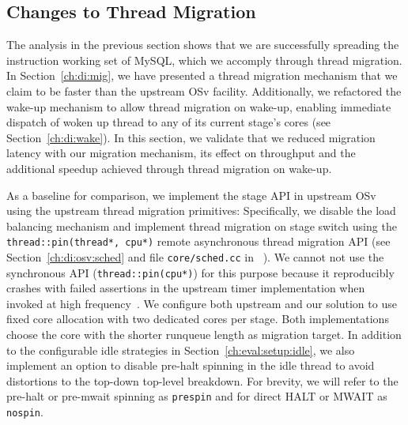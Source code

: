 \documentclass[12pt,a4paper]{book}
\begin{document}
\clearpage
\subsection{Changes to Thread Migration}\label{ch:eval:mig}

The analysis in the previous section shows that we are successfully spreading the instruction working set of MySQL, which we accomply through thread migration.
In Section~\ref{ch:di:mig}, we have presented a thread migration mechanism that we claim to be faster than the upstream OSv facility.
Additionally, we refactored the wake-up mechanism to allow thread migration on wake-up, enabling immediate dispatch of woken up thread to any of its current stage's cores (see Section~\ref{ch:di:wake}).
In this section, we validate that we reduced migration latency with our migration mechanism, its effect on throughput and the additional speedup achieved through thread migration on wake-up.

As a baseline for comparison, we implement the stage API in upstream OSv using the upstream thread migration primitives:
Specifically, we disable the load balancing mechanism and implement thread migration on stage switch using the \lstinline[style=figurecpp]{thread::pin(thread*, cpu*)} remote asynchronous thread migration API (see Section~\ref{ch:di:osv:sched} and file \texttt{core/sched.cc} in ~\cite{osvGit}).
We cannot not use the synchronous API (\lstinline[style=figurecpp]{thread::pin(cpu*)}) for this purpose because it reproducibly crashes with failed assertions in the upstream timer implementation when invoked at high frequency~\cite{osvBugSyncThreadMig}.
We configure both upstream and our solution to use fixed core allocation with two dedicated cores per stage.
Both implementations choose the core with the shorter runqueue length as migration target.
In addition to the configurable idle strategies in Section~\ref{ch:eval:setup:idle}, we also implement an option to disable pre-halt spinning in the idle thread to avoid distortions to the top-down top-level breakdown.
For brevity, we will refer to the pre-halt or pre-mwait spinning as \texttt{prespin} and for direct HALT or MWAIT as \texttt{nospin}.
\end{document}
